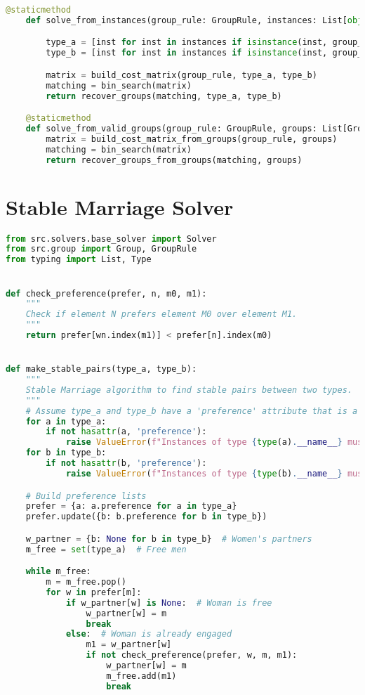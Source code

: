 \begin{apendicesenv}
\begin{lstlisting}[language=Python, caption={Hungarian Algorithm with Binary Search Solver Source Code}]
    @staticmethod
    def solve_from_instances(group_rule: GroupRule, instances: List[object]):

        type_a = [inst for inst in instances if isinstance(inst, group_rule.types[0])]
        type_b = [inst for inst in instances if isinstance(inst, group_rule.types[1])]

        matrix = build_cost_matrix(group_rule, type_a, type_b)
        matching = bin_search(matrix)
        return recover_groups(matching, type_a, type_b)

    @staticmethod
    def solve_from_valid_groups(group_rule: GroupRule, groups: List[Group]):
        matrix = build_cost_matrix_from_groups(group_rule, groups)
        matching = bin_search(matrix)
        return recover_groups_from_groups(matching, groups)
\end{lstlisting}

\chapter{Stable Marriage Solver}
\label{app:solver_stable_marriage}
\begin{lstlisting}[language=Python, caption={Stable Marriage Solver Source Code}]
from src.solvers.base_solver import Solver
from src.group import Group, GroupRule
from typing import List, Type


def check_preference(prefer, n, m0, m1):
    """
    Check if element N prefers element M0 over element M1.
    """
    return prefer[wn.index(m1)] < prefer[n].index(m0)


def make_stable_pairs(type_a, type_b):
    """
    Stable Marriage algorithm to find stable pairs between two types.
    """
    # Assume type_a and type_b have a 'preference' attribute that is a list of preferences
    for a in type_a:
        if not hasattr(a, 'preference'):
            raise ValueError(f"Instances of type {type(a).__name__} must have a 'preference' attribute.")
    for b in type_b:
        if not hasattr(b, 'preference'):
            raise ValueError(f"Instances of type {type(b).__name__} must have a 'preference' attribute.")

    # Build preference lists
    prefer = {a: a.preference for a in type_a}
    prefer.update({b: b.preference for b in type_b})

    w_partner = {b: None for b in type_b}  # Women's partners
    m_free = set(type_a)  # Free men

    while m_free:
        m = m_free.pop()
        for w in prefer[m]:
            if w_partner[w] is None:  # Woman is free
                w_partner[w] = m
                break
            else:  # Woman is already engaged
                m1 = w_partner[w]
                if not check_preference(prefer, w, m, m1):
                    w_partner[w] = m
                    m_free.add(m1)
                    break


\end{lstlisting}
\end{apendicesenv}
